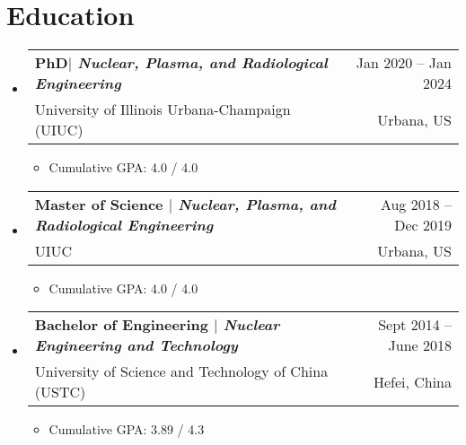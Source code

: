 \documentclass[letterpaper,11pt]{article} %
\makeatletter
\newcommand{\CVItem}[1]{
  \item\small{
    {#1 \vspace{-2pt}}
  }
}
\newcommand{\CVSubheading}[4]{
  \vspace{-2pt}\item
    \begin{tabular*}{0.97\textwidth}[t]{l@{\extracolsep{\fill}}r}
      \textbf{#1} & \footnotesize #2 \\
      \footnotesize #3 & \footnotesize #4 \\
    \end{tabular*}\vspace{-7pt}
}
\newcommand{\CVSubHeadingListStart}{\begin{itemize}[leftmargin=0.5cm, label={}]}
\newcommand{\CVSubHeadingListEnd}{\end{itemize}}
\newcommand{\CVItemListStart}{\begin{itemize}[rightmargin=\dimexpr\linewidth-15cm-\leftmargin\relax]}
\newcommand{\CVItemListEnd}{\end{itemize}\vspace{-5pt}}
\makeatother
\begin{document}
\section{Education}
  \CVSubHeadingListStart
    \CVSubheading
      {{PhD$|$ \emph{\small{Nuclear, Plasma, and Radiological Engineering}}}}{Jan 2020 -- Jan 2024}
      {University of Illinois Urbana-Champaign (UIUC)}{Urbana, US}
      \CVItemListStart
        \CVItem{Cumulative GPA:  4.0 / 4.0}
      \CVItemListEnd
    \CVSubheading
      {{Master of Science $|$ \emph{\small{Nuclear, Plasma, and Radiological Engineering}}}}{Aug 2018 -- Dec 2019}
      {UIUC}{Urbana, US}
       \CVItemListStart
        \CVItem{Cumulative GPA:  4.0 / 4.0}
      \CVItemListEnd
    \CVSubheading
      {{Bachelor of Engineering $|$ \emph{\small{Nuclear Engineering and Technology}}}}{Sept 2014 -- June 2018}
      {University of Science and Technology of China (USTC)}{Hefei, China}
       \CVItemListStart
        \CVItem{Cumulative GPA:  3.89 / 4.3}
      \CVItemListEnd
  \CVSubHeadingListEnd


\end{document}
